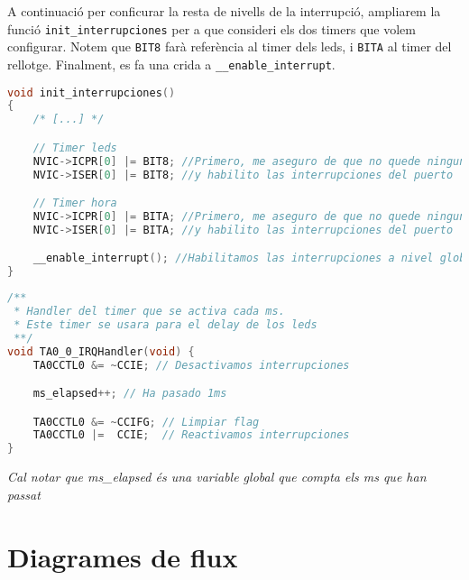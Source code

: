 \documentclass{../pdae} %
\begin{document}
A continuació per conficurar la resta de nivells de la interrupció, ampliarem la funció \texttt{init\_interrupciones} per a que consideri els dos timers que volem configurar. Notem que \texttt{BIT8} farà referència al timer dels leds, i \texttt{BITA} al timer del rellotge. Finalment, es fa una crida a \texttt{\_\_enable\_interrupt}.

\begin{lstlisting}[language=C]
void init_interrupciones()
{
 	/* [...] */

    // Timer leds
    NVIC->ICPR[0] |= BIT8; //Primero, me aseguro de que no quede ninguna interrupcion residual pendiente para este puerto,
    NVIC->ISER[0] |= BIT8; //y habilito las interrupciones del puerto

    // Timer hora
    NVIC->ICPR[0] |= BITA; //Primero, me aseguro de que no quede ninguna interrupcion residual pendiente para este puerto,
    NVIC->ISER[0] |= BITA; //y habilito las interrupciones del puerto

    __enable_interrupt(); //Habilitamos las interrupciones a nivel global del micro.
}
\end{lstlisting}


\begin{lstlisting}[language=C]
/**
 * Handler del timer que se activa cada ms.
 * Este timer se usara para el delay de los leds
 **/
void TA0_0_IRQHandler(void) {
    TA0CCTL0 &= ~CCIE; // Desactivamos interrupciones

    ms_elapsed++; // Ha pasado 1ms

    TA0CCTL0 &= ~CCIFG; // Limpiar flag
    TA0CCTL0 |=  CCIE;  // Reactivamos interrupciones
}
\end{lstlisting}
\textit{Cal notar que ms\_elapsed és una variable global que compta els ms que han passat}


\section{Diagrames de flux}
\end{document}
